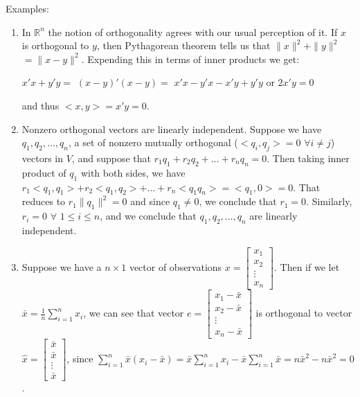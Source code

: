 \documentclass[12pt,oneside]{article}
\begin{document}
\noindent Examples:
\begin{enumerate}
\item In ${\mathbb{R}}^n$ the notion of orthogonality agrees with our
  usual perception of it. If $x$ is orthogonal to $y$, then
  Pythagorean theorem tells us that $\|x\|^2 + \|y\|^2$ $= \|x -
  y\|^2$. Expending this in terms of inner products we get:
\begin{center}
$x'x + y'y =$ $(x-y)'(x-y) =$ $x'x - y'x - x'y + y'y$ or $2 x'y = 0$
\end{center}
and thus $<x, y> = x'y = 0$.
\item Nonzero orthogonal vectors are linearly independent. Suppose we
  have $q_1, q_2, \ldots, q_n$, a set of nonzero mutually orthogonal
  ($<q_i, q_j> = 0$ $\forall i \neq j$) vectors in $V$, and suppose
  that $r_1 q_1 + r_2 q_2 + \ldots + r_n q_n = 0$. Then taking inner
  product of $q_1$ with both sides, we have $r_1 <q_1, q_1> + r_2
  <q_1, q_2> + \ldots + r_n <q_1 q_n> = <q_1, 0> = 0$.  That reduces
  to $r_1 \|q_1\|^2 = 0$ and since $q_1 \neq 0$, we conclude that $r_1 =
  0$. Similarly, $r_i = 0$ $\forall$ $1 \leq i \leq n$, and we
  conclude that $q_1, q_2, \ldots, q_n$ are linearly independent.
\item Suppose we have a $n \times 1$ vector of observations $x =
  \left[ \begin{array} {c} x_1 \\ x_2 \\ \vdots \\ x_n \end{array}
  \right]$. Then if we let $\bar{x} = \frac{1}{n}
  \displaystyle\sum_{i=1}^n {x_i}$, we can see that vector $e = \left[
  \begin{array} {c} x_1 - \bar{x} \\ x_2 - \bar{x} \\ \vdots \\ x_n -
  \bar{x} \end{array} \right]$ is orthogonal to vector $\hat{x} =
  \left[ \begin{array} {c} \bar{x} \\ \bar{x} \\ \vdots \\ \bar{x}
  \end{array} \right]$, since $\displaystyle\sum_{i=1}^n {\bar{x} (x_i
  - \bar{x})} = \bar{x} \displaystyle\sum_{i=1}^n{x_i} - \bar{x}
    \displaystyle\sum_{i=1}^n {\bar{x}} = n {\bar{x}}^2 - n
    {\bar{x}}^2 = 0$.
\end{enumerate}
\end{document}
